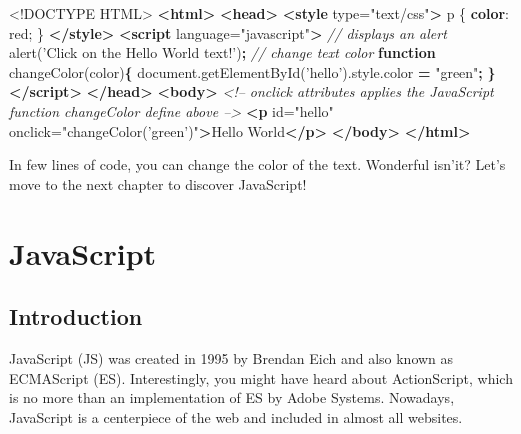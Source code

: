 \documentclass[]{book}
\newenvironment{Shaded}{\begin{snugshade}}{\end{snugshade}}
\newcommand{\AttributeTok}[1]{\textcolor[rgb]{0.77,0.63,0.00}{#1}}
\newcommand{\CommentTok}[1]{\textcolor[rgb]{0.56,0.35,0.01}{\textit{#1}}}
\newcommand{\DataTypeTok}[1]{\textcolor[rgb]{0.13,0.29,0.53}{#1}}
\newcommand{\DecValTok}[1]{\textcolor[rgb]{0.00,0.00,0.81}{#1}}
\newcommand{\KeywordTok}[1]{\textcolor[rgb]{0.13,0.29,0.53}{\textbf{#1}}}
\newcommand{\NormalTok}[1]{#1}
\newcommand{\OperatorTok}[1]{\textcolor[rgb]{0.81,0.36,0.00}{\textbf{#1}}}
\newcommand{\OtherTok}[1]{\textcolor[rgb]{0.56,0.35,0.01}{#1}}
\newcommand{\StringTok}[1]{\textcolor[rgb]{0.31,0.60,0.02}{#1}}
\newcommand{\VariableTok}[1]{\textcolor[rgb]{0.00,0.00,0.00}{#1}}
\begin{document}
\begin{Shaded}
\begin{Highlighting}[]
\DataTypeTok{<!DOCTYPE }\NormalTok{HTML}\DataTypeTok{>}
\KeywordTok{<html>}
  \KeywordTok{<head>}
    \KeywordTok{<style}\OtherTok{ type=}\StringTok{"text/css"}\KeywordTok{>}
\NormalTok{      p \{}
        \KeywordTok{color}\NormalTok{: }\DecValTok{red}\NormalTok{;}
\NormalTok{      \}}
    \KeywordTok{</style>}
    \KeywordTok{<script}\OtherTok{ language=}\StringTok{"javascript"}\KeywordTok{>}
      \CommentTok{// displays an alert }
      \AttributeTok{alert}\NormalTok{(}\StringTok{'Click on the Hello World text!'}\NormalTok{)}\OperatorTok{;}
      \CommentTok{// change text color}
      \KeywordTok{function} \AttributeTok{changeColor}\NormalTok{(color)}\OperatorTok{\{}
        \VariableTok{document}\NormalTok{.}\AttributeTok{getElementById}\NormalTok{(}\StringTok{'hello'}\NormalTok{).}\VariableTok{style}\NormalTok{.}\AttributeTok{color} \OperatorTok{=} \StringTok{"green"}\OperatorTok{;}
      \OperatorTok{\}}
    \KeywordTok{</script>}
  \KeywordTok{</head>}
  \KeywordTok{<body>}
    \CommentTok{<!-- onclick attributes applies the JavaScript function changeColor define above -->}
    \KeywordTok{<p}\OtherTok{ id=}\StringTok{"hello"}\OtherTok{ onclick=}\StringTok{"changeColor('green')"}\KeywordTok{>}\NormalTok{Hello World}\KeywordTok{</p>}
  \KeywordTok{</body>}
\KeywordTok{</html>}
\end{Highlighting}
\end{Shaded}

In few lines of code, you can change the color of the text. Wonderful isn'it?
Let's move to the next chapter to discover JavaScript!

\hypertarget{survival-kit-javascript}{%
\chapter{JavaScript}\label{survival-kit-javascript}}

\hypertarget{introduction}{%
\section{Introduction}\label{introduction}}

JavaScript (JS) was created in 1995 by Brendan Eich and also known as ECMAScript (ES). Interestingly, you might have heard about ActionScript, which is no more than an implementation of ES by Adobe Systems. Nowadays, JavaScript is a centerpiece of the web and included in almost all websites.
\end{document}
